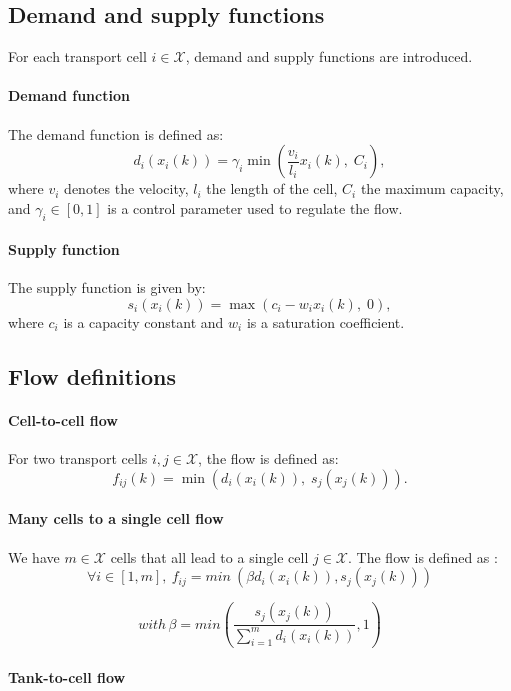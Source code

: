 \documentclass[12pt]{article}
\begin{document}
\subsection{Demand and supply functions}

For each transport cell $i \in \mathcal{X}$, demand and supply functions are introduced.

\paragraph{Demand function}

The demand function is defined as:
\[
d_i(x_i(k)) = \gamma_i \min\left( \frac{v_i}{l_i} x_i(k),\; C_i \right),
\]
where $v_i$ denotes the velocity, $l_i$ the length of the cell, $C_i$ the maximum capacity, and $\gamma_i \in [0,1]$ is a control parameter used to regulate the flow.

\paragraph{Supply function}

The supply function is given by:
\[
s_i(x_i(k)) = \max\left(c_i - w_i x_i(k),\; 0\right),
\]
where $c_i$ is a capacity constant and $w_i$ is a saturation coefficient.

\subsection{Flow definitions}

\paragraph{Cell-to-cell flow}

For two transport cells $i,j \in \mathcal{X}$, the flow is defined as:
\[
f_{ij}(k) = \min\left(d_i(x_i(k)),\; s_j(x_j(k))\right).
\]

\paragraph{Many cells to a single cell flow}
We have $ m \in \mathcal{X}$ cells that all lead to a single cell $j \in \mathcal{X}$. The flow is defined as : 
\[
    \forall i \in [1,m],\ f_{ij} = min\ (\beta d_i(x_i(k)),s_j(x_j(k)))
\]

\[
    with\,\beta=min(\frac{s_j(x_j(k))}{\sum_{i=1}^{m}{d_i(x_i(k))}},1)
\]

\paragraph{Tank-to-cell flow}
\end{document}
